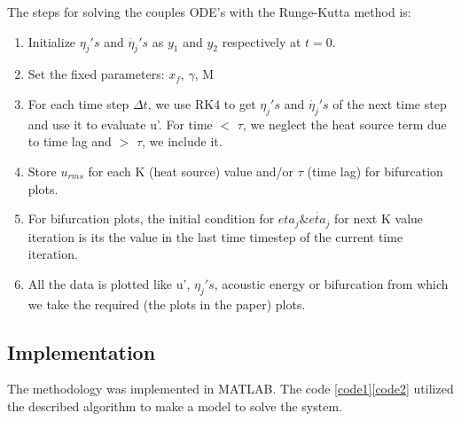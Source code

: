 \documentclass[8pt]{article} %
\begin{document}
The steps for solving the couples ODE's with the Runge-Kutta method is:
\begin{enumerate}
    \item Initialize $\eta_j's$  and $\dot{\eta_j}'s$ as $y_1$  and $y_2$ respectively at $t = 0$.
    \item Set the fixed parameters: $x_f$, $\gamma$, M
    \item For each time step $\Delta t$, we use RK4 to get $\eta_j's$  and $\dot{\eta_j}'s$ of the next time step and use it to evaluate u'. For time $<$ $\tau$, we neglect the heat source term due to time lag and $>$ $\tau$, we include it.
    \item Store $u_{rms}$ for each K (heat source) value and/or $\tau$ (time lag) for bifurcation plots.
    \item For bifurcation plots, the initial condition for $eta_j \& \dot{eta_j}$ for next K value iteration is its the value in the last time timestep of the current time iteration.  
    \item All the data is plotted like u', $\eta_j's$, acoustic energy or bifurcation from which we take the required (the plots in the paper) plots.
\end{enumerate}

\subsection{Implementation}
The methodology was implemented in MATLAB. The code \ref{code1}\ref{code2} utilized the described algorithm to make a model to solve the system.
\end{document}
